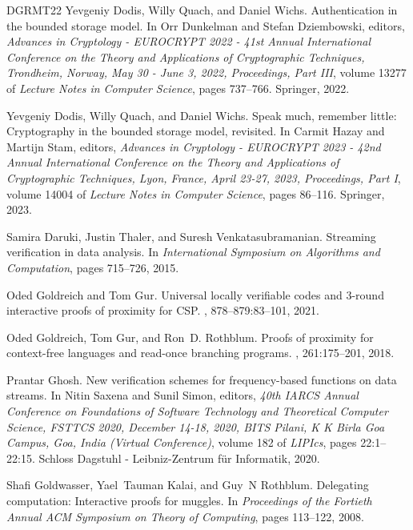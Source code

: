 \documentclass[10pt,a4paper]{article}
\theoremstyle{definition}
\begin{document}
\begin{thebibliography}{DGRMT22}
Yevgeniy Dodis, Willy Quach, and Daniel Wichs.
\newblock Authentication in the bounded storage model.
\newblock In Orr Dunkelman and Stefan Dziembowski, editors, {\em Advances in Cryptology - {EUROCRYPT} 2022 - 41st Annual International Conference on the Theory and Applications of Cryptographic Techniques, Trondheim, Norway, May 30 - June 3, 2022, Proceedings, Part {III}}, volume 13277 of {\em Lecture Notes in Computer Science}, pages 737--766. Springer, 2022.

Yevgeniy Dodis, Willy Quach, and Daniel Wichs.
\newblock Speak much, remember little: Cryptography in the bounded storage model, revisited.
\newblock In Carmit Hazay and Martijn Stam, editors, {\em Advances in Cryptology - {EUROCRYPT} 2023 - 42nd Annual International Conference on the Theory and Applications of Cryptographic Techniques, Lyon, France, April 23-27, 2023, Proceedings, Part {I}}, volume 14004 of {\em Lecture Notes in Computer Science}, pages 86--116. Springer, 2023.

Samira Daruki, Justin Thaler, and Suresh Venkatasubramanian.
\newblock Streaming verification in data analysis.
\newblock In {\em International Symposium on Algorithms and Computation}, pages 715--726, 2015.

Oded Goldreich and Tom Gur.
\newblock Universal locally verifiable codes and 3-round interactive proofs of proximity for {{CSP}}.
, 878--879:83--101, 2021.

Oded Goldreich, Tom Gur, and Ron~D. Rothblum.
\newblock Proofs of proximity for context-free languages and read-once branching programs.
, 261:175--201, 2018.

Prantar Ghosh.
\newblock New verification schemes for frequency-based functions on data streams.
\newblock In Nitin Saxena and Sunil Simon, editors, {\em 40th {{IARCS}} Annual Conference on Foundations of Software Technology and Theoretical Computer Science, {{FSTTCS}} 2020, December 14-18, 2020, {{BITS}} Pilani, {{K K}} Birla Goa Campus, Goa, India (Virtual Conference)}, volume 182 of {\em {{LIPIcs}}}, pages 22:1--22:15. {Schloss Dagstuhl - Leibniz-Zentrum f\"ur Informatik}, 2020.

Shafi Goldwasser, Yael~Tauman Kalai, and Guy~N Rothblum.
\newblock Delegating computation: Interactive proofs for muggles.
\newblock In {\em Proceedings of the Fortieth Annual {{ACM}} Symposium on {{Theory}} of Computing}, pages 113--122, 2008.


\end{thebibliography}
\end{document}
